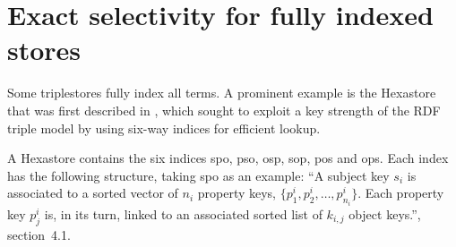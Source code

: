\documentclass[12pt, draft]{article}
\newcommand{\rdfterm}[1]{\texttt{#1}}
\newcommand{\todo}[1]{\ensuremath{^{\textrm{\tiny{TODO}\normalsize}}}\footnote{\textbf{TODO:}~#1}}
\newcommand{\sel}[1]{\ensuremath{sel\left(#1\right)}}
\begin{document}






\section{Exact selectivity for fully indexed stores}

Some triplestores fully index all terms. A prominent example is the
Hexastore that was first described in
\cite{Weiss:2008:HSI:1453856.1453965}, which sought to exploit a key
strength of the RDF triple model by using six-way indices for
efficient lookup.

A Hexastore contains the six indices \textsf{spo}, \textsf{pso},
\textsf{osp}, \textsf{sop}, \textsf{pos} and \textsf{ops}. Each index
has the following structure, taking \textsf{spo} as an example: ``A
subject key $s_i$ is associated to a sorted vector of $n_i$ property
keys, $\{p_1^i , p_2^i , \ldots , p^i_{n_i} \}$. Each property key $p_j^i$
is, in its turn, linked to an associated sorted list of $k_{i,j}$
object keys.''\cite{Weiss:2008:HSI:1453856.1453965}, section~4.1.
\end{document}
